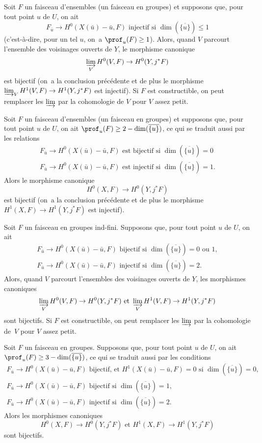 \begin{enumeratea}
\item
Soit $F$ un faisceau d'ensembles (\resp un faisceau en groupes) et supposons que, pour tout point $u$ de $U$, on ait
$$F_{\bar{u}} \to H^0(X(\bar{u})-\bar{u}, F)\text{ injectif si } \dim(\overline{\{u\}}) \leq 1$$
(c'est-\`a-dire, pour un tel $u$, on~a $\prof_u(F) \geq 1$). Alors, quand $V$ parcourt l'ensemble des voisinages ouverts de $Y$, le morphisme canonique\pageoriginale
$$
\varinjlim_V H^0(V, F) \to H^0(Y, j^*F)
$$
est bijectif (\resp on~a la conclusion pr\'ec\'edente et de plus le morphisme $\varinjlim_V H^1(V, F) \to H^1(Y, j^* F)$ est injectif). Si $F$ est constructible, on peut remplacer les $\varinjlim$ par la cohomologie de $V$ pour $V$ \og assez petit\fg.
\item
Soit $F$ un faisceau d'ensembles (\resp un faisceau en groupes) et supposons que, pour tout point $u$ de $U$, on ait $\prof_u(F) \geq 2 -\dim(\overline{\{u\}})$, ce qui se traduit aussi par les relations
\begin{gather*}
F_{\bar{u}}\to H^0(X(\bar{u})-\bar{u}, F)\text{ est bijectif si } \dim(\overline{\{u\}})=0\\
F_{\bar{u}}\to H^0(X(\bar{u})-\bar{u}, F)\text{ est injectif si } \dim(\overline{\{u\}})=1.
\end{gather*}
Alors le morphisme canonique
$$H^0(X, F) \to H^0(Y, j^*F)$$
est bijectif (\resp on~a la conclusion pr\'ec\'edente et de plus le morphisme $H^1(X, F) \to H^1(Y, j^*F)$ est injectif).
\item
Soit $F$ un faisceau en groupes ind-fini. Supposons que, pour tout point $u$ de $U$, on ait
\begin{gather*}
F_{\bar{u}}\to H^0(X(\bar{u})-\bar{u}, F)\text{ bijectif si } \dim(\overline{\{u\}})=0\text{ ou }1,\\
F_{\bar{u}}\to H^0(X(\bar{u})-\bar{u}, F)\text{ injectif si } \dim(\overline{\{u\}})=2.
\end{gather*}
Alors\pageoriginale, quand $V$ parcourt l'ensembles des voisinages ouverts de $Y$, les morphismes canoniques
$$
\varinjlim_V H^0(V, F) \to H^0(Y, j^*F) \text{ et } \varinjlim_V H^1(V, F) \to H^1(Y, j^*F)
$$
sont bijectifs. Si $F$ est constructible, on peut remplacer les $\varinjlim$ par la cohomologie de~$V$ pour $V$ assez petit.
\item
Soit $F$ un faisceau en groupes. Supposons que, pour tout point $u$ de $U$, on ait $\prof_u(F) \geq 3-\dim(\overline{\{u\}})$, ce qui se traduit aussi par les conditions
\begin{gather*}
F_{\bar{u}}\to H^0(X(\bar{u})-\bar{u}, F)\text{ bijectif, et } H^1(X(\bar{u})-\bar{u}, F)=0 \text{ si } \dim(\overline{\{u\}})=0,\\
F_{\bar{u}}\to H^0(X(\bar{u})-\bar{u}, F)\text{ bijectif si } \dim(\overline{\{u\}})=1,\\
F_{\bar{u}}\to H^0(X(\bar{u})-\bar{u}, F)\text{ injectif si } \dim(\overline{\{u\}})=2.
\end{gather*}
Alors les morphismes canoniques
$$H^0(X, F) \to H^0(Y, j^*F)\text{ et } H^1(X, F) \to H^1(Y, j^*F)$$
sont bijectifs.
\end{enumeratea}

